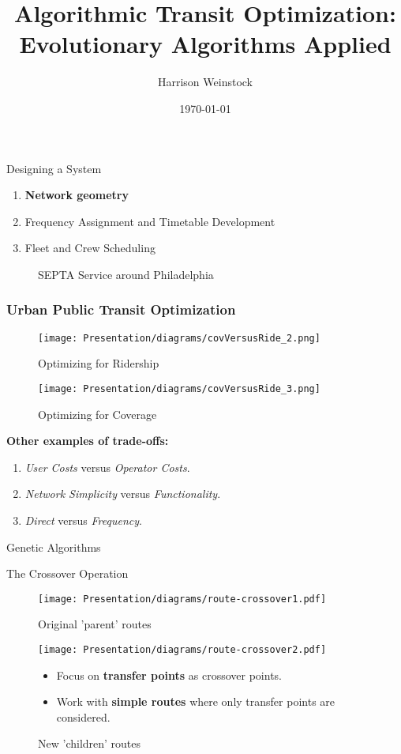 \documentclass{beamer}
\title{Algorithmic Transit Optimization: Evolutionary Algorithms Applied}
\author{Harrison Weinstock}
\institute{Haverford College}
\date{\today}
\begin{document}
\frame{\titlepage}

\begin{frame}{Designing a System}

  \begin{enumerate}
    \item \textbf{Network geometry}
    \item Frequency Assignment and Timetable Development
    \item Fleet and Crew Scheduling
    \end{enumerate}
\endminipage\hfill
{}%
\begin{figure}
  \caption{SEPTA Service around Philadelphia \cite{SEPTA}}
\end{figure}
\endminipage
\end{frame}

\begin{frame}
\frametitle{Urban Public Transit Optimization}
\begin{figure}[!htb]
  \texttt{[image: Presentation/diagrams/covVersusRide\_2.png]}
  \caption{Optimizing for Ridership \cite{walker2012}}\label{fig:ridership}
\endminipage\hfill
{}%
  \texttt{[image: Presentation/diagrams/covVersusRide\_3.png]}
  \caption{Optimizing for Coverage \cite{walker2012}}\label{fig:coverage}
\endminipage
\end{figure}
\textbf{Other examples of trade-offs:}
\begin{enumerate}
    \item \textit{User Costs} versus \textit{Operator Costs}.  
    \item \textit{Network Simplicity} versus \textit{Functionality}. 
    \item \textit{Direct} versus \textit{Frequency}. 
\end{enumerate}
\end{frame}

\begin{frame}{Genetic Algorithms}
\end{frame}

\begin{frame}{The Crossover Operation}
\begin{figure}
  \texttt{[image: Presentation/diagrams/route-crossover1.pdf]}
  \caption{Original 'parent' routes}\label{fig:parents}
\endminipage\hfill
{}%
  \texttt{[image: Presentation/diagrams/route-crossover2.pdf]}
  \caption{New 'children' routes}\label{fig:children}
\endminipage
\begin{itemize}
    \item Focus on \textbf{transfer points} as crossover points. 
    \item Work with \textbf{simple routes} where only transfer points are considered. 
\end{itemize}
\end{figure}
\end{frame}
\end{document}
